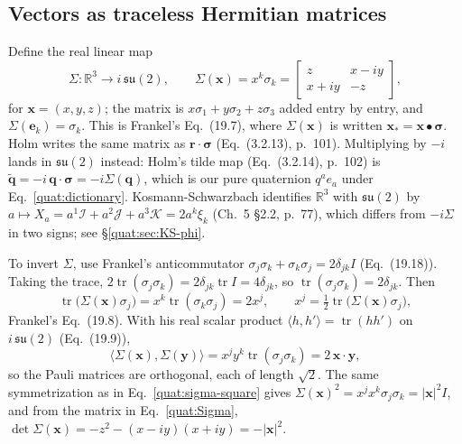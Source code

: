 \subsection{Vectors as traceless Hermitian matrices}
Define the real linear map
\begin{equation}\label{quat:Sigma}
 \Sigma\colon\mathbb R^3\to i\,\mathfrak{su}(2),\qquad
 \Sigma(\mathbf x)=x^k\sigma_k
 =\begin{bmatrix}z&x-iy\\x+iy&-z\end{bmatrix},
\end{equation}
for $\mathbf x=(x,y,z)$; the matrix is
$x\sigma_1+y\sigma_2+z\sigma_3$ added entry by entry, and
$\Sigma(\mathbf e_k)=\sigma_k$. This is Frankel's Eq.~(19.7), where
$\Sigma(\mathbf x)$ is written $\mathbf x_*=\mathbf x\bullet\boldsymbol\sigma$.
Holm writes the same matrix as $\mathbf r\cdot\boldsymbol\sigma$
(Eq.~(3.2.13), p.~101). Multiplying by $-i$ lands in $\mathfrak{su}(2)$
instead: Holm's tilde map (Eq.~(3.2.14), p.~102) is
$\widetilde{\mathbf q}=-i\,\mathbf q\cdot\boldsymbol\sigma=-i\Sigma(\mathbf q)$,
which is our pure quaternion $q^ae_a$ under Eq.~\eqref{quat:dictionary}.
Kosmann-Schwarzbach identifies $\mathbb R^3$ with $\mathfrak{su}(2)$ by
$a\mapsto X_a=a^1\mathcal I+a^2\mathcal J+a^3\mathcal K=2a^k\xi_k$
(Ch.~5 \S2.2, p.~77), which differs from $-i\Sigma$ in two signs; see
\S\ref{quat:sec:KS-phi}.

To invert $\Sigma$, use Frankel's anticommutator
$\sigma_j\sigma_k+\sigma_k\sigma_j=2\delta_{jk}I$ (Eq.~(19.18)). Taking
the trace, $2\operatorname{tr}(\sigma_j\sigma_k)=2\delta_{jk}\operatorname{tr}I
=4\delta_{jk}$, so $\operatorname{tr}(\sigma_j\sigma_k)=2\delta_{jk}$. Then
\begin{equation}\label{quat:Sigma-inverse}
 \operatorname{tr}\bigl(\Sigma(\mathbf x)\sigma_j\bigr)
 =x^k\operatorname{tr}(\sigma_k\sigma_j)=2x^j,\qquad
 x^j=\tfrac12\operatorname{tr}\bigl(\Sigma(\mathbf x)\sigma_j\bigr),
\end{equation}
Frankel's Eq.~(19.8). With his real scalar product
$\langle h,h'\rangle=\operatorname{tr}(hh')$ on $i\,\mathfrak{su}(2)$
(Eq.~(19.9)),
\begin{equation}\label{quat:Sigma-metric}
 \langle\Sigma(\mathbf x),\Sigma(\mathbf y)\rangle
 =x^jy^k\operatorname{tr}(\sigma_j\sigma_k)=2\,\mathbf x\cdot\mathbf y ,
\end{equation}
so the Pauli matrices are orthogonal, each of length $\sqrt2$. The same
symmetrization as in Eq.~\eqref{quat:sigma-square} gives
$\Sigma(\mathbf x)^2=x^jx^k\sigma_j\sigma_k=|\mathbf x|^2I$, and from the
matrix in Eq.~\eqref{quat:Sigma},
$\det\Sigma(\mathbf x)=-z^2-(x-iy)(x+iy)=-|\mathbf x|^2$.

